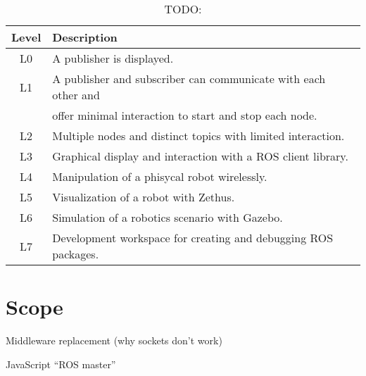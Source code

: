         \begin{table}[htbp]
            \centering	
            \caption{TODO:}
                \begin{tabular}{cl}
                    \toprule
                    \textbf{Level} & \textbf{Description} \\
                    \midrule
                    L0 & A publisher is displayed. \\ [0.3em]
                    L1 & A publisher and subscriber can communicate with each other and \\
                       & offer minimal interaction to start and stop each node. \\[0.3em]
                    L2 & Multiple nodes and distinct topics with limited interaction. \\[0.3em]
                    L3 & Graphical display and interaction with a ROS client library. \\[0.3em]
                    L4 & Manipulation of a phisycal robot wirelessly. \\[0.3em]
                    L5 & Visualization of a robot with Zethus. \\[0.3em]
                    L6 & Simulation of a robotics scenario with Gazebo. \\[0.3em]
                    L7 & Development workspace for creating and debugging ROS packages. \\
                \bottomrule
            \end{tabular}\label{tab:techlevels}
        \end{table}

\section{Scope}

    Middleware replacement (why sockets don't work)

    JavaScript ``ROS master''

